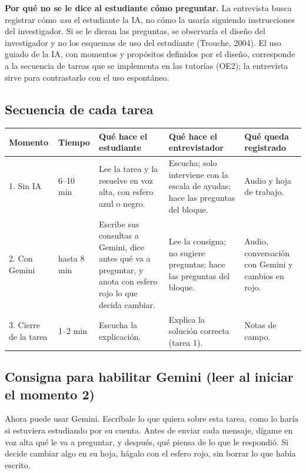 \documentclass[11pt,letterpaper]{article}
\newcounter{preg}
\begin{document}
\noindent\textbf{Por qué no se le dice al estudiante cómo preguntar.} La entrevista busca registrar cómo \emph{usa} el estudiante la IA, no cómo la usaría siguiendo instrucciones del investigador. Si se le dieran las preguntas, se observaría el diseño del investigador y no los esquemas de uso del estudiante (Trouche, 2004). El uso guiado de la IA, con momentos y propósitos definidos por el diseño, corresponde a la secuencia de tareas que se implementa en las tutorías (OE2); la entrevista sirve para contrastarlo con el uso espontáneo.

\subsection{Secuencia de cada tarea}
\begin{center}
\small
\renewcommand{\arraystretch}{1.3}
\begin{tabularx}{\linewidth}{@{}p{2.2cm}p{1.2cm}LLp{2.4cm}@{}}
\toprule
\textbf{Momento} & \textbf{Tiempo} & \textbf{Qué hace el estudiante} & \textbf{Qué hace el entrevistador} & \textbf{Qué queda registrado}\\
. Sin IA & 6--10 min & Lee la tarea y la resuelve en voz alta, con esfero azul o negro. & Escucha; solo interviene con la escala de ayudas; hace las preguntas del bloque. & Audio y hoja de trabajo.\\
2. Con Gemini & hasta 8 min & Escribe sus consultas a Gemini, dice antes qué va a preguntar, y anota con esfero rojo lo que decida cambiar. & Lee la consigna; no sugiere preguntas; hace las preguntas del bloque. & Audio, conversación con Gemini y cambios en rojo.\\
3. Cierre de la tarea & 1--2 min & Escucha la explicación. & Explica la solución correcta (tarea 1). & Notas de campo.\\
\bottomrule
\end{tabularx}
\end{center}

\subsection{Consigna para habilitar Gemini (leer al iniciar el momento 2)}
\begin{guion}
Ahora puede usar Gemini. Escríbale lo que quiera sobre esta tarea, como lo haría si estuviera estudiando por su cuenta. Antes de enviar cada mensaje, dígame en voz alta qué le va a preguntar, y después, qué piensa de lo que le respondió. Si decide cambiar algo en su hoja, hágalo con el esfero rojo, sin borrar lo que había escrito.
\end{guion}
\end{document}
